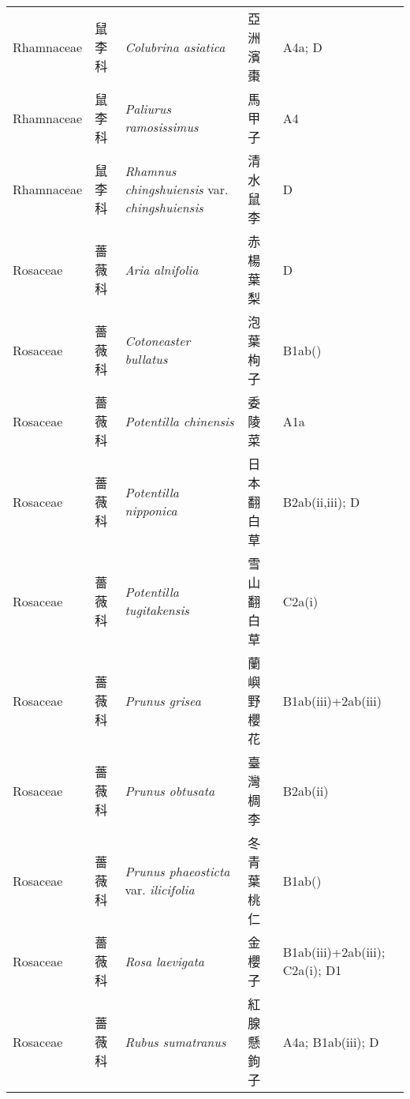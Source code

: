 {\begin{longtable}{p{2.5cm}p{2.5cm}p{4.5cm}p{2.5cm}p{3cm}}
    Rhamnaceae & 鼠李科 & \textit{Colubrina asiatica}  & 亞洲濱棗 & A4a; D \index{Colubrina@\textit{Colubrina}!asiatica@\textit{asiatica}}  \index{亞洲濱棗} \\
    Rhamnaceae & 鼠李科 & \textit{Paliurus ramosissimus}  & 馬甲子 & A4 \index{Paliurus@\textit{Paliurus}!ramosissimus@\textit{ramosissimus}}  \index{馬甲子} \\
    Rhamnaceae & 鼠李科 & \textit{Rhamnus chingshuiensis} var. \textit{chingshuiensis}  & 清水鼠李 & D \index{Rhamnus@\textit{Rhamnus}!chingshuiensis@\textit{chingshuiensis}!var. chingshuiensis@var. \textit{chingshuiensis}}  \index{清水鼠李} \\
    Rosaceae & 薔薇科 & \textit{Aria alnifolia}  & 赤楊葉梨 & D \index{Aria@\textit{Aria}!alnifolia@\textit{alnifolia}}  \index{赤楊葉梨} \\
    Rosaceae & 薔薇科 & \textit{Cotoneaster bullatus}  & 泡葉栒子 & B1ab() \index{Cotoneaster@\textit{Cotoneaster}!bullatus@\textit{bullatus}}  \index{泡葉栒子} \\
    Rosaceae & 薔薇科 & \textit{Potentilla chinensis}  & 委陵菜 & A1a \index{Potentilla@\textit{Potentilla}!chinensis@\textit{chinensis}}  \index{委陵菜} \\
    Rosaceae & 薔薇科 & \textit{Potentilla nipponica}  & 日本翻白草 & B2ab(ii,iii); D \index{Potentilla@\textit{Potentilla}!nipponica@\textit{nipponica}}  \index{日本翻白草} \\
    Rosaceae & 薔薇科 & \textit{Potentilla tugitakensis}  & 雪山翻白草 & C2a(i) \index{Potentilla@\textit{Potentilla}!tugitakensis@\textit{tugitakensis}}  \index{雪山翻白草} \\
    Rosaceae & 薔薇科 & \textit{Prunus grisea}  & 蘭嶼野櫻花 & B1ab(iii)+2ab(iii) \index{Prunus@\textit{Prunus}!grisea@\textit{grisea}}  \index{蘭嶼野櫻花} \\
    Rosaceae & 薔薇科 & \textit{Prunus obtusata}  & 臺灣椆李 & B2ab(ii) \index{Prunus@\textit{Prunus}!obtusata@\textit{obtusata}}  \index{臺灣椆李} \\
    Rosaceae & 薔薇科 & \textit{Prunus phaeosticta} var. \textit{ilicifolia}  & 冬青葉桃仁 & B1ab() \index{Prunus@\textit{Prunus}!phaeosticta@\textit{phaeosticta}!var. ilicifolia@var. \textit{ilicifolia}}  \index{冬青葉桃仁} \\
    Rosaceae & 薔薇科 & \textit{Rosa laevigata}  & 金櫻子 & B1ab(iii)+2ab(iii); C2a(i); D1 \index{Rosa@\textit{Rosa}!laevigata@\textit{laevigata}}  \index{金櫻子} \\
    Rosaceae & 薔薇科 & \textit{Rubus sumatranus}  & 紅腺懸鉤子 & A4a; B1ab(iii); D \index{Rubus@\textit{Rubus}!sumatranus@\textit{sumatranus}}  \index{紅腺懸鉤子} \\

\end{longtable}}
